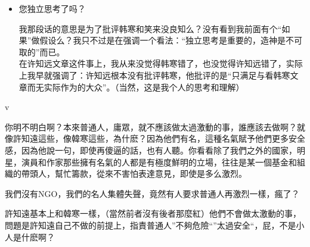 \begin{itemize}[<+->]
\item
  您独立思考了吗？

  我那段话的意思是为了批评韩寒和笑来没良知么？没有看到我前面有个``如果''做假设么？我只不过是在强调一个看法：``独立思考是重要的，造神是不可取的''而已。\\
  在许知远文章这件事上，我从来没觉得韩寒错了，也没觉得许知远错了，实际上我早就强调了：许知远根本没有批评韩寒，他批评的是``只满足与看韩寒文章而无实际作为的大众''。（当然，这是我个人的思考和理解）
\end{itemize}

v

你明不明白啊？本來普通人，庸眾，就不應該做太過激動的事，誰應該去做啊？就像許知遠這些，像韓寒這些，為什麽？因為他們有名，這種名氣賦予他們更多安全感，因為他說一句，即使再傻逼的話，也有人聽。你看看除了我們之外的國家，明星，演員和作家那些擁有名氣的人都是有極度鮮明的立場，往往是某一個基金和組織的帶頭人，幫忙籌款，從來不害怕表達意見，即使是多么激烈。

我們沒有NGO，我們的名人集體失聲，竟然有人要求普通人再激烈一樣，瘋了？

許知遠基本上和韓寒一樣，（當然前者沒有後者那麼紅）他們不會做太激動的事，問題是許知遠自己不做的前提上，指責普通人''不夠危險``''太過安全``，屁，不是小人是什麽啊？

